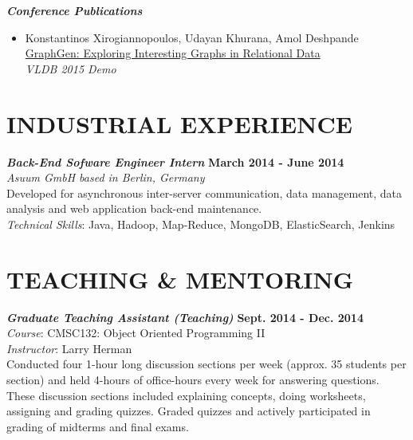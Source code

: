 \documentclass[margin, 10pt]{res} %
\begin{document}
\begin{resume}
{\sl \textbf{Conference Publications} }\\
\begin{itemize}
  \item Konstantinos Xirogiannopoulos, Udayan Khurana, Amol Deshpande\\
  \href{http://www.vldb.org/pvldb/vol8/p2032-xirogiannopoulos.pdf}{GraphGen: Exploring Interesting Graphs in Relational Data}\\
  \textit{VLDB 2015 Demo}
\end{itemize}


\section{INDUSTRIAL EXPERIENCE}

{\sl \textbf{Back-End Sofware Engineer Intern} } \hfill \textbf{March 2014 - June 2014}\\
\textit{Asuum GmbH based in Berlin, Germany}\\
Developed for asynchronous inter-server communication, data management, data analysis and web application back-end maintenance.\\
\textit{Technical Skills}: Java, Hadoop, Map-Reduce, MongoDB, ElasticSearch, Jenkins


\section{TEACHING \& MENTORING}

{\sl \textbf{Graduate Teaching Assistant (Teaching)}} \hfill \textbf{Sept. 2014 - Dec. 2014}\\
\textit{Course}: CMSC132: Object Oriented Programming II \\
\textit{Instructor}: Larry Herman\\
Conducted four 1-hour long discussion sections per week (approx. 35 students per section) and held 4-hours of office-hours every week for answering questions. These discussion sections included explaining concepts, doing worksheets, assigning and grading quizzes. Graded quizzes and actively participated in grading of midterms and final exams.




\end{resume}
\end{document}
